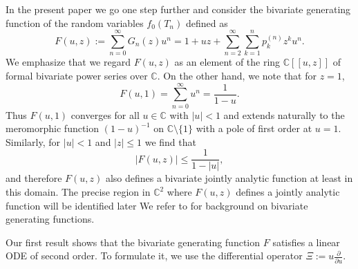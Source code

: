 \documentclass[11pt,a4paper]{article}
\numberwithin{equation}{section}
\def\CC{\mathbb{C}}
\begin{document}
In the present paper we go one step further and consider the bivariate generating function of the random variables $f_0(T_n)$ defined as
\begin{equation*}
    F(u,z) := \sum_{n=0}^\infty G_n(z) u^n = 1+ uz + \sum_{n=2}^\infty \sum_{k=1}^n p_k^{(n)} z^k u^n.
\end{equation*}
We emphasize that we regard $F(u,z)$ as an element of the ring $\CC[[u,z]]$ of formal bivariate power series over $\CC$. On the other hand, we note that for $z=1$,
\begin{equation*}
    F(u,1) = \sum_{n=0}^\infty u^n = \frac{1}{1-u}.
\end{equation*}
Thus $F(u,1)$ converges for all $u\in\CC$ with $|u|<1$ and extends naturally to the meromorphic function $(1-u)^{-1}$ on $\CC\setminus\{1\}$ with a pole of first order at $u=1$. Similarly, for $|u|<1$ and $|z|\leq 1$ we find that
\begin{equation*}
    |F(u,z)| \leq \frac{1}{1-|u|},
\end{equation*}
and therefore $F(u,z)$ also defines a bivariate jointly analytic function at least in this domain. The precise region in $\CC^2$ where $F(u,z)$  defines a jointly analytic function will be identified later We refer to \cite[Ch.\ III.~1.]{FS:2009} for background on bivariate generating functions.

Our first result shows that the bivariate generating function $F$ satisfies a linear ODE of second order. To formulate it, we use the differential operator $\Xi := u \frac{\partial }{\partial u}$.
\end{document}
